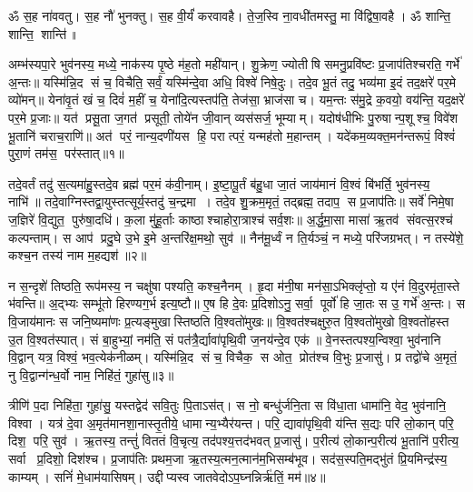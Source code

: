 \setcounter{anuvakam}{0}
ॐ स॒ह ना॑ववतु। स॒ह नौ॑ भुनक्तु। स॒ह वी॒र्यं॑ करवावहै। ते॒ज॒स्वि ना॒वधी॑तमस्तु॒ मा वि॑द्विषा॒वहै। ॐ शान्ति॒ शान्ति॒ शान्ति॑॥

अम्भ॑स्यपा॒रे भुव॑नस्य॒ मध्ये॒ नाक॑स्य पृ॒ष्ठे म॑ह॒तो मही॑यान्। शु॒क्रेण॒ ज्योतीषि समनु॒प्रवि॑ष्टः प्र॒जाप॑तिश्चरति॒ गर्भे॑ अ॒न्तः॥ यस्मि॑न्नि॒द सं च॒ विचैति॒ सर्वं॒ यस्मि॑न्दे॒वा अधि॒ विश्वे॑ निषे॒दुः। तदे॒व भू॒तं तदु॒ भव्य॑मा इ॒दं तद॒क्षरे॑ पर॒मे व्यो॑मन्॥ येना॑वृ॒तं खं च॒ दिवं॑ म॒हीं च॒ येना॑दि॒त्यस्तप॑ति॒ तेज॑सा॒ भ्राज॑सा च। यम॒न्तः स॑मु॒द्रे क॒वयो॒ वय॑न्ति॒ यद॒क्षरे॑ पर॒मे प्र॒जाः॥ यत॑ प्रसू॒ता ज॒गत॑ प्रसूती॒ तोये॑न जी॒वान् व्यस॑सर्ज॒ भूम्याम्। यदोष॑धीभिः पु॒रुषान्प॒शूश्च॒ विवे॑श भू॒तानि॑ चराच॒राणि॑॥ अत॑ परं॒ नान्य॒दणी॑यस हि॒ परात्परं॒ यन्मह॑तो म॒हान्तम्। यदे॑कम॒व्यक्त॒मन॑न्तरूपं॒ विश्वं॑ पुरा॒णं तम॑स॒ पर॑स्तात्॥१॥

तदे॒वर्तं तदु॑ स॒त्यमा॑हु॒स्तदे॒व ब्रह्म॑ पर॒मं क॑वी॒नाम्। इ॒ष्टा॒पू॒र्तं ब॑हु॒धा जा॒तं जाय॑मानं वि॒श्वं बि॑भर्ति॒ भुव॑नस्य॒ नाभि॑॥ तदे॒वाग्निस्तद्वा॒युस्तत्सूर्य॒स्तदु॑ च॒न्द्रमा। तदे॒व शु॒क्रम॒मृतं॒ तद्ब्रह्म॒ तदाप॒ स प्र॒जाप॑तिः॥ सर्वे॑ निमे॒षा ज॒ज्ञिरे॑ वि॒द्युत॒ पुरु॑षा॒दधि॑। क॒ला मु॑हू॒र्ताः काष्ठाश्चाहोरा॒त्राश्च॑ सर्व॒शः॥ अ॒र्द्ध॒मा॒सा मासा॑ ऋ॒तव॑ संवत्स॒रश्च॑ कल्पन्ताम्। स आप॑ प्रदु॒घे उ॒भे इ॒मे अ॒न्तरि॑क्ष॒मथो॒ सुव॑॥ नैन॑मू॒र्ध्वं न ति॒र्यञ्चं॒ न मध्ये॒ परि॑जग्रभत्। न तस्ये॑शे॒ कश्च॒न तस्य॑ नाम म॒हद्यश॑॥२॥

न स॒न्दृशे॑ तिष्ठति॒ रूप॑मस्य॒ न चक्षु॑षा पश्यति॒ कश्च॒नैनम्। हृ॒दा म॑नी॒षा मन॑सा॒ऽभिक्लृ॑प्तो॒ य ए॑नं वि॒दुरमृ॑ता॒स्ते भ॑वन्ति॥ अ॒द्भ्यः सम्भू॑तो हिरण्यग॒र्भ इत्य॒ष्टौ॥ ए॒ष हि दे॒वः प्र॒दिशोऽनु॒ सर्वा॒ पूर्वो॑ हि जा॒तः स उ॒ गर्भे॑ अ॒न्तः। स वि॒जाय॑मानः स जनि॒ष्यमा॑णः प्र॒त्यङ्मुखास्तिष्ठति वि॒श्वतो॑मुखः॥ वि॒श्वत॑श्चक्षुरु॒त वि॒श्वतो॑मुखो वि॒श्वतो॑हस्त उ॒त वि॒श्वत॑स्पात्। सं बा॒हुभ्यां॒ नम॑ति॒ सं पत॑त्रै॒र्द्यावा॑पृथि॒वी ज॒नय॑न्दे॒व एक॑॥ वे॒नस्तत्पश्य॒न्विश्वा॒ भुव॑नानि वि॒द्वान् यत्र॒ विश्वं॒ भव॒त्येक॑नीळम्। यस्मि॑न्नि॒द सं च॒ विचैक॒ स ओत॒ प्रोत॑श्च वि॒भुः प्र॒जासु॑। प्र तद्वो॑चे अ॒मृतं॒ नु वि॒द्वान्ग॑न्ध॒र्वो नाम॒ निहि॑तं॒ गुहा॑सु॥३॥

त्रीणि॑ प॒दा निहि॑ता॒ गुहा॑सु॒ यस्तद्वेद॑ सवि॒तुः पि॒ताऽस॑त्। स नो॒ बन्धु॑र्जनि॒ता स वि॑धा॒ता धामा॑नि॒ वेद॒ भुव॑नानि॒ विश्वा। यत्र॑ दे॒वा अ॒मृत॑मानशा॒नास्तृ॒तीये॒ धामान्य॒भ्यैर॑यन्त। परि॒ द्यावा॑पृथि॒वी य॑न्ति स॒द्यः परि॑ लो॒कान् परि॒ दिश॒ परि॒ सुव॑। ऋ॒तस्य॒ तन्तुं॑ विततं वि॒चृत्य॒ तद॑पश्य॒त्तद॑भवत् प्र॒जासु॑। प॒रीत्य॑ लो॒कान्प॒रीत्य॑ भू॒तानि॑ प॒रीत्य॒ सर्वा प्र॒दिशो॒ दिश॑श्च। प्र॒जाप॑तिः प्रथम॒जा ऋ॒तस्य॒\aav{}\aav{}त्मन॒\aav{}\aav{}त्मान॑म॒भिसम्ब॑भूव। सद॑स॒स्पति॒मद्भु॑तं प्रि॒यमिन्द्र॑स्य॒ काम्यम्। सनिं॑ मे॒धाम॑यासिषम्। उद्दीप्यस्व जातवेदोऽप॒घ्नन्निर्\mbox{}ऋ॑तिं॒ मम॑॥४॥

